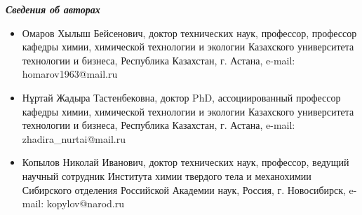 \emph{{\bfseries Сведения об авторах}}

\begin{itemize}
\item
Омаров Хылыш Бейсенович, доктор технических наук, профессор, профессор
кафедры химии, химической технологии и экологии Казахского университета
технологии и бизнеса, Республика Казахстан, г. Астана, e-mail:
homarov1963@mail.ru

\item
Нұртай Жадыра Тастенбековна, доктор PhD, ассоциированный профессор
кафедры химии, химической технологии и экологии Казахского университета
технологии и бизнеса, Республика Казахстан, г. Астана, e-mail:
zhadira\_nurtai@mail.ru

\item
Копылов Николай Иванович, доктор технических наук, профессор, ведущий
научный сотрудник Института химии твердого тела и механохимии Сибирского
отделения Российской Академии наук, Россия, г. Новосибирск, e-mail:
kopylov@narod.ru
\end{itemize}
